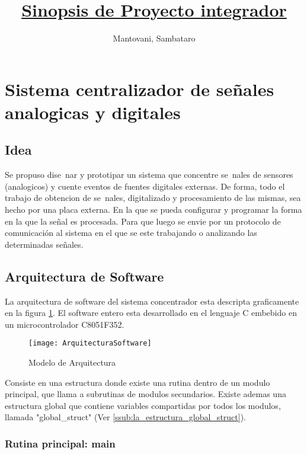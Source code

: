 \documentclass[a4paper]{article}
\title{\textbf{\underline{Sinopsis de Proyecto integrador}}  \\}
\author{Mantovani, Sambataro}
\date{}
\begin{document}
\maketitle

\section{Sistema centralizador de señales analogicas y digitales}
\subsection{Idea} %
\label{sub:idea}

Se propuso dise~nar y prototipar un sistema que concentre se~nales de sensores (analogicos) y cuente eventos de fuentes digitales externas. De forma, todo el trabajo de
obtencion de se~nales, digitalizado y procesamiento de las mismas, sea hecho por una placa externa. En la que se pueda configurar y programar la forma en la que la señal es procesada. Para que luego se envie por un protocolo de comunicación al sistema en el que se este trabajando o analizando las determinadas señales.

\subsection{Arquitectura de Software} %
\label{sub:arquitectura}

La arquitectura de software del sistema concentrador esta descripta graficamente en la figura \ref{fig:arquitectura}. El software entero esta desarrollado en el lenguaje C embebido en un microcontrolador C8051F352.

\begin{figure}[h]
  \centering
  \texttt{[image: ArquitecturaSoftware]}
  \caption{Modelo de Arquitectura}\label{fig:arquitectura}
\end{figure}

Consiste en una estructura donde existe una rutina dentro de un modulo principal, que llama a subrutinas de modulos secundarios. Existe ademas una estructura global que contiene variables compartidas por todos los modulos, llamada "global\_struct" (Ver \ref{ssub:la_estructura_global_struct}). 

\subsubsection{Rutina principal: main} %
\label{ssub:rutina_principal_main_c}
\end{document}
